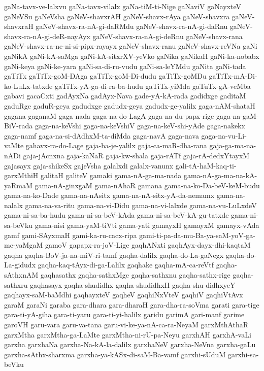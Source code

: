 {gaNa-tavx-ve-lalxvu
gaNa-tavx-vilalx
gaNa-tiM-ti-Nige
gaNaviV
gaNayxteV
gaNeVSu
gaNeVsha
gaNeV-shavxrAH
gaNeV-shavx-rAya
gaNeV-shavxra
gaNeV-shavxraH
gaNeV-shavx-ra-nA-gi-daRMdu
gaNeV-shavx-ra-nA-gi-daRnu
gaNeV-shavx-ra-nA-gi-deR-nayAyx
gaNeV-shavx-ra-nA-gi-deRnu
gaNeV-shavx-rana
gaNeV-shavx-ra-ne-ni-si-pipx-rayayx
gaNeV-shavx-ranu
gaNeV-shavx-reVNa
gaNi
gaNikA
gaNi-kA-saMga
gaNi-kA-sitxrXV-yeVko
gaNika
gaNikaH
gaNi-ka-nobabx
gaNi-keya
gaNi-ke-yara
gaNi-sa-di-ru-vudu
gaNi-sa-leYMdu
gaNita
gaNi-tada
gaTiTx
gaTiTx-goM-DAga
gaTiTx-goM-Di-dudu
gaTiTx-goMDu
gaTiTx-mA-Di-ko-LuLx-tatxde
gaTiTx-yA-ga-di-ra-ba-hudu
gaTiTx-yiMda
gaTuTx-gA-veMba
gabavi
gacaCxti
gadAyxNa
gadAyx-Nava
gade-yA-kA-rada
gadidxge
gaditaM
gaduRge
gaduR-geya
gadudxge
gadudx-geya
gadudx-ge-yalilx
gaga-nAM-shataH
gagana
gaganaM
gaga-nada
gaga-na-do-LagA
gaga-na-du-papx-rige
gaga-na-gaM-BiV-rada
gaga-na-keVshi
gaga-na-keVshiV
gaga-na-keV-shi-yAde
gaga-nakekx
gaga-namf
gaga-na-si-dAdhxM-ta-diMda
gaga-navA
gaga-nava
gaga-na-vu-Li-vaMte
gahavx-ra-do-Lage
gaja-ba-je-yalilx
gaja-ca-maR-dha-rana
gaja-ga-ma-na-nADi
gaja-jAcnxna
gaja-kaNaR
gaja-kw-shala
gaja-rATf
gaja-rA-dedxYtayxM
gajasayx
gaja-shikeSx
gajeVsha
galalxdi
galalx-vanunx
gali-tA-haM-kaq-ti-garxMthiH
galitaH
galiteV
gamaki
gama-nA-ga-ma-nada
gama-nA-ga-ma-na-kA-yaRmaM
gama-nA-ginxgaM
gama-nAhaR
gamana
gama-na-ko-Da-beV-keM-budu
gama-na-ko-Dade
gama-na-nAsitx
gama-na-nA-sitx-yA-da-nemamx
gama-na-nalalx
gama-na-va-ritu
gama-na-vi-Didu
gama-na-vi-lalxde
gama-na-vu-LuLxdeV
gama-ni-sa-ba-hudu
gama-ni-sa-beV-kAda
gama-ni-sa-beV-kA-gu-tatxde
gama-ni-sa-beVku
gama-nisi
gama-yaM-tiVti
gama-yati
gamayxH
gamayxM
gamayx-vAda
gamf
gami-SAyxmaH
gami-ka-ru-cacx-ripa
gami-ti-pa-da-mu-Ba-ya-saM-yoV-ga-me-yaMgaM
gamoV
gapapx-ra-joV-Lige
gaqhANxti
gaqhAyx-dayx-dhi-kaqtaM
gaqha
gaqha-BoV-ja-na-miV-ri-tamf
gaqha-dalilx
gaqha-do-La-gaNegx
gaqha-do-La-gidudx
gaqha-kaq-tAyx-di-ga-Lalilx
gaqhake
gaqha-mA-ca-reVtf
gaqha-sAthxnAM
gaqhasathx
gaqha-sathxMge
gaqha-sathxnu
gaqha-sathx-rige
gaqha-sathxru
gaqhasayx
gaqha-shudidhx
gaqha-shudidhxH
gaqha-shu-didhxyeY
gaqhayx-saM-baMdhi
gaqhayxteV
gaqheV
gaqhiNxVteV
gaqhiV
gaqhiVtAvx
garaM
garaNi
garaba
gara-dhara
gara-dharaH
gara-dha-ra-soVma
garati
gara-tige
gara-ti-yA-giha
gara-ti-yaru
gara-ti-yi-halilx
garidu
garimA
gari-manf
garime
garoVH
garu-vara
garu-va-tana
garu-vi-ke-ya-nA-ca-ra-NeyaM
garxMthAthaR
garxMtha
garxMtha-ga-LaMte
garxMtha-ni-rU-pa-Neyu
garxhAH
garxhA-vaLi
garxha
garxhaNa
garxha-Na-kA-la-dalilx
garxhaNeV
garxha-NeVna
garxha-gaLu
garxha-sAthx-sharxma
garxha-ya-kASx-di-saM-Ba-vamf
garxhi-sUduM
garxhi-sa-beVku
}
